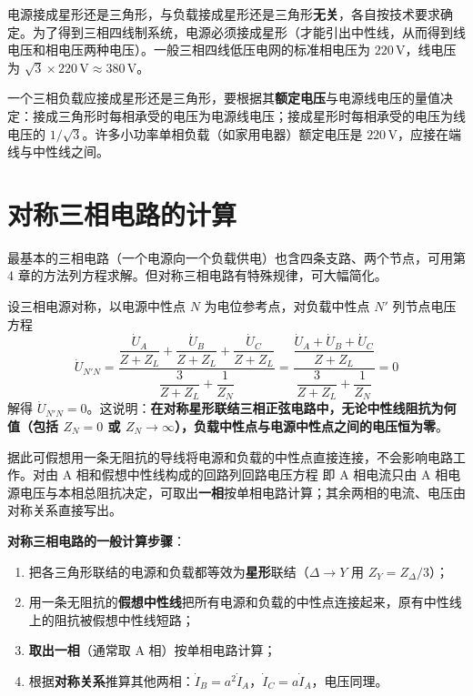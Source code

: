 电源接成星形还是三角形，与负载接成星形还是三角形\textbf{无关}，各自按技术要求确定。为了得到三相四线制系统，电源必须接成星形（才能引出中性线，从而得到线电压和相电压两种电压）。一般三相四线低压电网的标准相电压为 $220\,\mathrm{V}$，线电压为 $\sqrt{3}\times220\,\mathrm{V}\approx380\,\mathrm{V}$。

一个三相负载应接成星形还是三角形，要根据其\textbf{额定电压}与电源线电压的量值决定：接成三角形时每相承受的电压为电源线电压；接成星形时每相承受的电压为线电压的 $1/\sqrt{3}$。许多小功率单相负载（如家用电器）额定电压是 $220\,\mathrm{V}$，应接在端线与中性线之间。


\section{对称三相电路的计算}
最基本的三相电路（一个电源向一个负载供电）也含四条支路、两个节点，可用第 4 章的方法列方程求解。但对称三相电路有特殊规律，可大幅简化。

设三相电源对称，以电源中性点 $N$ 为电位参考点，对负载中性点 $N'$ 列节点电压方程
\begin{equation}
\dot{U}_{N'N}=\frac{\dfrac{\dot{U}_A}{Z+Z_L}+\dfrac{\dot{U}_B}{Z+Z_L}+\dfrac{\dot{U}_C}{Z+Z_L}}{\dfrac{3}{Z+Z_L}+\dfrac{1}{Z_N}}
=\frac{\dfrac{\dot{U}_A+\dot{U}_B+\dot{U}_C}{Z+Z_L}}{\dfrac{3}{Z+Z_L}+\dfrac{1}{Z_N}}=0
\end{equation}
解得 $\dot{U}_{N'N}=0$。这说明：\textbf{在对称星形联结三相正弦电路中，无论中性线阻抗为何值（包括 $Z_N=0$ 或 $Z_N\to\infty$），负载中性点与电源中性点之间的电压恒为零}。

据此可假想用一条无阻抗的导线将电源和负载的中性点直接连接，不会影响电路工作。对由 A 相和假想中性线构成的回路列回路电压方程
即 A 相电流只由 A 相电源电压与本相总阻抗决定，可取出\textbf{一相}按单相电路计算；其余两相的电流、电压由对称关系直接写出。

\textbf{对称三相电路的一般计算步骤}：
\begin{enumerate}
  \item 把各三角形联结的电源和负载都等效为\textbf{星形}联结（$\Delta\to Y$ 用 $Z_Y=Z_\Delta/3$）；
  \item 用一条无阻抗的\textbf{假想中性线}把所有电源和负载的中性点连接起来，原有中性线上的阻抗被假想中性线短路；
  \item \textbf{取出一相}（通常取 A 相）按单相电路计算；
  \item 根据\textbf{对称关系}推算其他两相：$\dot{I}_B=a^2\dot{I}_A$，$\dot{I}_C=a\dot{I}_A$，电压同理。
\end{enumerate}

